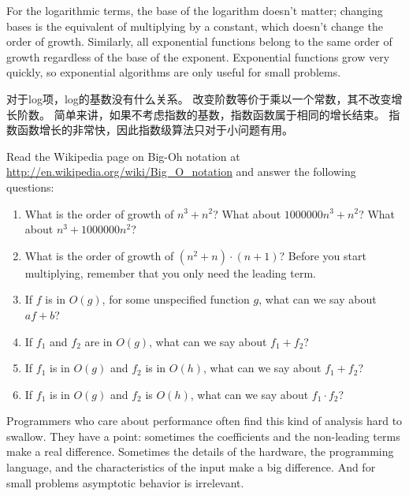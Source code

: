 \documentclass[10pt]{book}
\begin{document}
\begin{CJK}{UTF8}{gbsn}
For the logarithmic terms, the base of the logarithm doesn't matter;
changing bases is the equivalent of multiplying by a constant, which
doesn't change the order of growth.  Similarly, all exponential
functions belong to the same order of growth regardless of the base of
the exponent.
Exponential functions grow very quickly, so exponential algorithms are
only useful for small problems.

对于log项，log的基数没有什么关系。
改变阶数等价于乘以一个常数，其不改变增长阶数。
简单来讲，如果不考虑指数的基数，指数函数属于相同的增长结束。
指数函数增长的非常快，因此指数级算法只对于小问题有用。

\begin{exercise}

Read the Wikipedia page on Big-Oh notation at
\url{http://en.wikipedia.org/wiki/Big_O_notation} and
answer the following questions:

\begin{enumerate}
\item What is the order of growth of $n^3 + n^2$?
What about $1000000 n^3 + n^2$?
What about $n^3 + 1000000 n^2$?

\item What is the order of growth of $(n^2 + n) \cdot (n + 1)$?  Before
  you start multiplying, remember that you only need the leading term.

\item If $f$ is in $O(g)$, for some unspecified function $g$, what can
  we say about $af+b$?

\item If $f_1$ and $f_2$ are in $O(g)$, what can we say about $f_1 + f_2$?

\item If  $f_1$ is in $O(g)$
and $f_2$ is in $O(h)$,
what can we say about  $f_1 + f_2$?

\item If  $f_1$ is in $O(g)$ and $f_2$ is $O(h)$,
what can we say about  $f_1 \cdot f_2$?
\end{enumerate}

\end{exercise}

Programmers who care about performance often find this kind of
analysis hard to swallow.  They have a point: sometimes the
coefficients and the non-leading terms make a real difference.
Sometimes the details of the hardware, the programming language, and
the characteristics of the input make a big difference.  And for small
problems asymptotic behavior is irrelevant.


\end{CJK}
\end{document}
